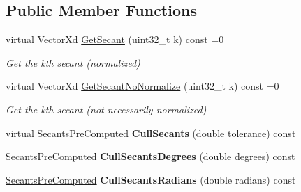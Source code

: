 \subsection*{Public Member Functions}
\begin{DoxyCompactItemize}
\item 
\hypertarget{struct_d_r_d_s_p_1_1_secants_a9fd886acfd2ffd083685f1c3a58db4fc}{virtual Vector\-Xd \hyperlink{struct_d_r_d_s_p_1_1_secants_a9fd886acfd2ffd083685f1c3a58db4fc}{Get\-Secant} (uint32\-\_\-t k) const =0}\label{struct_d_r_d_s_p_1_1_secants_a9fd886acfd2ffd083685f1c3a58db4fc}

\begin{DoxyCompactList}\small\item\em Get the kth secant (normalized) \end{DoxyCompactList}\item 
\hypertarget{struct_d_r_d_s_p_1_1_secants_ac919bfb4875117588b6a2a0c5938b59e}{virtual Vector\-Xd \hyperlink{struct_d_r_d_s_p_1_1_secants_ac919bfb4875117588b6a2a0c5938b59e}{Get\-Secant\-No\-Normalize} (uint32\-\_\-t k) const =0}\label{struct_d_r_d_s_p_1_1_secants_ac919bfb4875117588b6a2a0c5938b59e}

\begin{DoxyCompactList}\small\item\em Get the kth secant (not necessarily normalized) \end{DoxyCompactList}\item 
\hypertarget{struct_d_r_d_s_p_1_1_secants_a9b6763bc1541a775e842e437448200ef}{virtual \hyperlink{struct_d_r_d_s_p_1_1_secants_pre_computed}{Secants\-Pre\-Computed} {\bfseries Cull\-Secants} (double tolerance) const }\label{struct_d_r_d_s_p_1_1_secants_a9b6763bc1541a775e842e437448200ef}

\item 
\hypertarget{struct_d_r_d_s_p_1_1_secants_abc02bf01e73c2d89848a090c88666291}{\hyperlink{struct_d_r_d_s_p_1_1_secants_pre_computed}{Secants\-Pre\-Computed} {\bfseries Cull\-Secants\-Degrees} (double degrees) const }\label{struct_d_r_d_s_p_1_1_secants_abc02bf01e73c2d89848a090c88666291}

\item 
\hypertarget{struct_d_r_d_s_p_1_1_secants_aec22fc746a9047366d7b81729a2e4f8a}{\hyperlink{struct_d_r_d_s_p_1_1_secants_pre_computed}{Secants\-Pre\-Computed} {\bfseries Cull\-Secants\-Radians} (double radians) const }\label{struct_d_r_d_s_p_1_1_secants_aec22fc746a9047366d7b81729a2e4f8a}

\end{DoxyCompactItemize}
